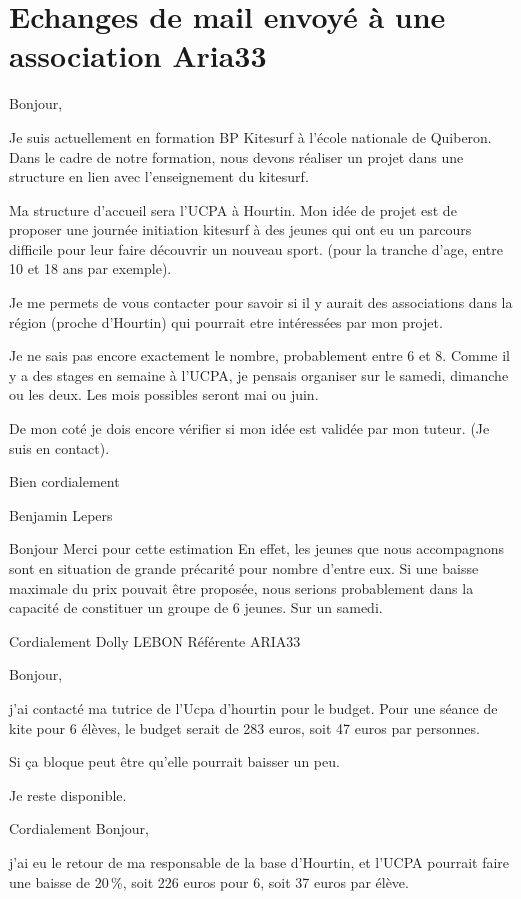 \documentclass[12pt,a4paper]{report}
\begin{document}
\chapter{Echanges de mail envoyé à une association Aria33}\label{appendix_mail}
Bonjour,

Je suis actuellement en formation BP Kitesurf à l'école nationale de Quiberon.
Dans le cadre de notre formation, nous devons réaliser un projet dans
une structure en lien avec l'enseignement du kitesurf.

Ma structure d'accueil sera l'UCPA à Hourtin.
Mon idée de projet est de proposer une journée initiation kitesurf à
des jeunes qui ont eu un parcours difficile pour leur faire découvrir
un nouveau sport.
 (pour la tranche d'age, entre 10 et 18 ans par exemple).

Je me permets de vous contacter pour savoir si il y aurait des
associations dans la région (proche d'Hourtin) qui pourrait etre
intéressées par mon projet.

Je ne sais pas encore exactement le nombre, probablement entre 6 et 8.
Comme il y a des stages en semaine à l'UCPA, je pensais organiser sur
le samedi, dimanche ou les deux. Les mois possibles seront mai ou
juin.

De mon coté je dois encore vérifier si mon idée est validée par mon
tuteur. (Je suis en contact).


Bien cordialement

Benjamin Lepers

\bigskip
Bonjour
Merci pour cette estimation
En effet, les jeunes que nous accompagnons sont en situation de grande
précarité pour nombre d'entre eux. Si une baisse maximale du prix
pouvait être proposée, nous serions probablement dans la capacité
de constituer un groupe de 6 jeunes. Sur un samedi.

Cordialement
Dolly LEBON
Référente ARIA33

\bigskip
Bonjour,

j'ai contacté ma tutrice de l'Ucpa d'hourtin pour le budget.
Pour une séance de kite  pour 6 élèves, le budget serait de 283 euros,
soit 47 euros par personnes.

Si ça bloque peut être qu'elle pourrait baisser un peu.


Je reste disponible.

Cordialement
\bigskip
Bonjour,

j'ai eu le retour de ma responsable de la base d'Hourtin, et l'UCPA
pourrait faire une baisse de 20\,\%, soit 226 euros pour 6, soit 37 euros
par élève.
\end{document}
